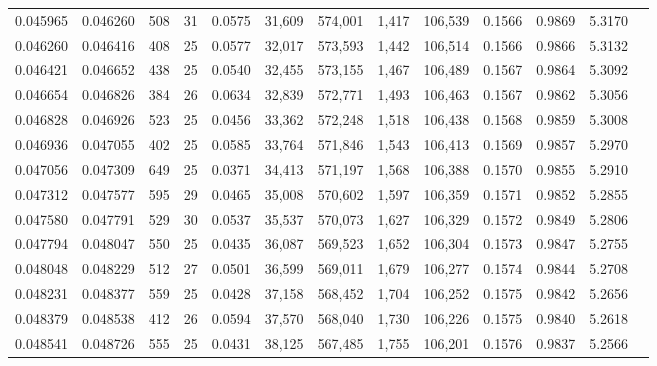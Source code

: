 \begin{tabular}{rrrrrrrrrrrrr}
0.045965 & 0.046260 & 508 &  31 &                                     0.0575 &  31,609 & 574,001 &   1,417 & 106,539 & 0.1566 & 0.9869 & 5.3170 \\
0.046260 & 0.046416 & 408 &  25 &                                     0.0577 &  32,017 & 573,593 &   1,442 & 106,514 & 0.1566 & 0.9866 & 5.3132 \\
0.046421 & 0.046652 & 438 &  25 &                                     0.0540 &  32,455 & 573,155 &   1,467 & 106,489 & 0.1567 & 0.9864 & 5.3092 \\
0.046654 & 0.046826 & 384 &  26 &                                     0.0634 &  32,839 & 572,771 &   1,493 & 106,463 & 0.1567 & 0.9862 & 5.3056 \\
0.046828 & 0.046926 & 523 &  25 &                                     0.0456 &  33,362 & 572,248 &   1,518 & 106,438 & 0.1568 & 0.9859 & 5.3008 \\
0.046936 & 0.047055 & 402 &  25 &                                     0.0585 &  33,764 & 571,846 &   1,543 & 106,413 & 0.1569 & 0.9857 & 5.2970 \\
0.047056 & 0.047309 & 649 &  25 &                                     0.0371 &  34,413 & 571,197 &   1,568 & 106,388 & 0.1570 & 0.9855 & 5.2910 \\
0.047312 & 0.047577 & 595 &  29 &                                     0.0465 &  35,008 & 570,602 &   1,597 & 106,359 & 0.1571 & 0.9852 & 5.2855 \\
0.047580 & 0.047791 & 529 &  30 &                                     0.0537 &  35,537 & 570,073 &   1,627 & 106,329 & 0.1572 & 0.9849 & 5.2806 \\
0.047794 & 0.048047 & 550 &  25 &                                     0.0435 &  36,087 & 569,523 &   1,652 & 106,304 & 0.1573 & 0.9847 & 5.2755 \\
0.048048 & 0.048229 & 512 &  27 &                                     0.0501 &  36,599 & 569,011 &   1,679 & 106,277 & 0.1574 & 0.9844 & 5.2708 \\
0.048231 & 0.048377 & 559 &  25 &                                     0.0428 &  37,158 & 568,452 &   1,704 & 106,252 & 0.1575 & 0.9842 & 5.2656 \\
0.048379 & 0.048538 & 412 &  26 &                                     0.0594 &  37,570 & 568,040 &   1,730 & 106,226 & 0.1575 & 0.9840 & 5.2618 \\
0.048541 & 0.048726 & 555 &  25 &                                     0.0431 &  38,125 & 567,485 &   1,755 & 106,201 & 0.1576 & 0.9837 & 5.2566 \\

\end{tabular}
